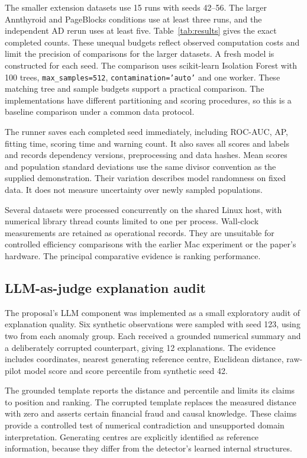 \documentclass[11pt]{article}
\begin{document}
The smaller extension datasets use 15 runs with seeds 42--56. The larger Annthyroid and PageBlocks conditions use at least three runs, and the independent AD rerun uses at least five. Table~\ref{tab:results} gives the exact completed counts. These unequal budgets reflect observed computation costs and limit the precision of comparisons for the larger datasets. A fresh model is constructed for each seed. The comparison uses scikit-learn Isolation Forest with 100 trees, \texttt{max\_samples=512}, \texttt{contamination='auto'} and one worker. These matching tree and sample budgets support a practical comparison. The implementations have different partitioning and scoring procedures, so this is a baseline comparison under a common data protocol.

The runner saves each completed seed immediately, including ROC-AUC, AP, fitting time, scoring time and warning count. It also saves all scores and labels and records dependency versions, preprocessing and data hashes. Mean scores and population standard deviations use the same divisor convention as the supplied demonstration. Their variation describes model randomness on fixed data. It does not measure uncertainty over newly sampled populations.

Several datasets were processed concurrently on the shared Linux host, with numerical library thread counts limited to one per process. Wall-clock measurements are retained as operational records. They are unsuitable for controlled efficiency comparisons with the earlier Mac experiment or the paper's hardware. The principal comparative evidence is ranking performance.

\subsection{LLM-as-judge explanation audit}
The proposal's LLM component was implemented as a small exploratory audit of explanation quality. Six synthetic observations were sampled with seed 123, using two from each anomaly group. Each received a grounded numerical summary and a deliberately corrupted counterpart, giving 12 explanations. The evidence includes coordinates, nearest generating reference centre, Euclidean distance, raw-pilot model score and score percentile from synthetic seed 42.

The grounded template reports the distance and percentile and limits its claims to position and ranking. The corrupted template replaces the measured distance with zero and asserts certain financial fraud and causal knowledge. These claims provide a controlled test of numerical contradiction and unsupported domain interpretation. Generating centres are explicitly identified as reference information, because they differ from the detector's learned internal structures.
\end{document}
